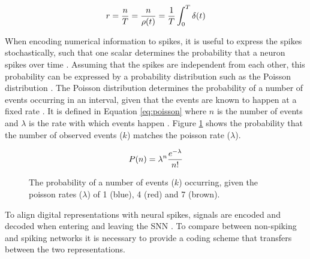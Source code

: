 \documentclass[report.tex]{subfiles}
\begin{document}
\begin{equation}
  r = {n \over T} = {n \over \rho(t)} = {1 \over T} \int_0^T \delta(t)
\label{eq:spikerate}
\end{equation}

When encoding numerical information to spikes, it is useful to 
express the spikes stochastically, such that one scalar determines
the probability that a neuron spikes over time \cite{Dayan2001}.
Assuming that the spikes are independent from each other, this
probability can be expressed by a probability distribution such as the
Poisson distribution
\cite{Dayan2001}.
The Poisson distribution determines the probability of a number
of events occurring in an interval, given that the events are
known to happen at a fixed rate \cite{Dayan2001}.
It is defined in Equation \ref{eq:poisson} where $n$ is the
number of events and $\lambda$ is the rate with which events
happen \cite{Dayan2001}.
Figure \ref{fig:poisson} shows the probability that the number of
observed events ($k$) matches the poisson rate ($\lambda$).

\begin{equation}
P(n) = \lambda^n {e^{-\lambda} \over n!}
\label{eq:poisson}
\end{equation}

\begin{figure}
\centering
{}
\caption{The probability of a number of events ($k$) occurring, given the
poisson rates ($\lambda$) of 1 (blue), 4 (red) and 7 (brown).}
\label{fig:poisson}
\end{figure}

To align digital representations with neural spikes,
signals are encoded and decoded when entering and leaving the \gls{SNN}
\cite{Dayan2001}.
To compare between non-spiking and spiking networks it is necessary to 
provide a coding scheme that transfers between the two representations.
\end{document}
